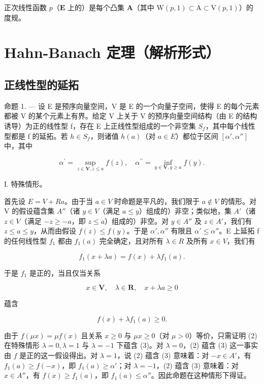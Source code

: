 正次线性函数 \(p\)（\(\mathbf{E}\) 上的）是每个凸集 \(\mathbf{A}\)（其中 \(\mathrm{W}(p,1)\subset \mathrm{A}\subset \mathrm{V}(p,1)\)）的度规。

\section{Hahn-Banach 定理（解析形式）}

\subsection{正线性型的延拓}

命题 1. --- 设 E 是预序向量空间，V 是 E 的一个向量子空间，使得 E 的每个元素都被 V 的某个元素上有界。给定 V 上关于 V 的预序向量空间结构（由 E 的结构诱导）为正的线性型 f，存在 E 上正线性型组成的一个非空集 \(S_{f}\)，其中每个线性型都是 f 的延拓。若 \(h \in S_{f}\)，则诸值 \(h(a)\)（对 \(a \in E\)）都位于区间 \([\alpha', \alpha'']\) 中，其中

\[
\alpha^ {\prime} = \sup _ {z \in \mathbf {V}, z \leqslant a} f (z), \quad \alpha^ {\prime \prime} = \inf _ {y \in \mathbf {V}, y \geqslant a} f (y).\tag{1}
\]

I. 特殊情形。

首先设 \(E = V + R a\)。由于当 \(a \in V\) 时命题是平凡的，我们限于 \(a \notin V\) 的情形。对 V 的假设蕴含集 \(A''\)（诸 \(y \in V\)（满足 \(a \leqslant y\)）组成的）非空；类似地，集 \(A'\)（诸 \(z \in V\)（满足 \(-z \geqslant -a\)，即 \(z \leqslant a\)）组成的）非空。对 \(y \in A''\) 及 \(z \in A'\)，我们有 \(z \leqslant a \leqslant y\)，从而由假设 \(f(z) \leqslant f(y)\)。于是 \(\alpha', \alpha''\) 有限且 \(\alpha' \leqslant \alpha''\)。E 上延拓 f 的任何线性型 \(f_1\) 都由 \(f_1(a)\) 完全确定，且对所有 \(\lambda \in R\) 及所有 \(x \in V\)，我们有

\[
f _ {1} (x + \lambda a) = f (x) + \lambda f _ {1} (a).
\]

于是 \(f_{1}\) 是正的，当且仅当关系

\[
x \in \mathbf {V}, \quad \lambda \in \mathbf {R}, \quad x + \lambda a \geqslant 0\tag{2}
\]

蕴含

\[
f (x) + \lambda f _ {1} (a) \geqslant 0.\tag{3}
\]

由于 \(f(\mu x) = \mu f(x)\) 且关系 \(x \geqslant 0\) 与 \(\mu x \geqslant 0\)（对 \(\mu > 0\)）等价，只需证明 (2) 在特殊情形 \(\lambda = 0, \lambda = 1\) 与 \(\lambda = -1\) 下蕴含 (3)。对 \(\lambda = 0\)，(2) 蕴含 (3) 这一事实由 \(f\) 是正的这一假设得出。对 \(\lambda = 1\)，说 (2) 蕴含 (3) 意味着：对 \(-x \in A'\)，有 \(f_1(a) \geqslant f(-x)\)，即 \(f_1(a) \geqslant \alpha'\)；对 \(\lambda = -1\)，(2) 蕴含 (3) 意味着：对 \(x \in A''\)，有 \(f(x) \geqslant f_1(a)\)，即 \(f_1(a) \leqslant \alpha''\)。因此命题在这种情形下得证。

